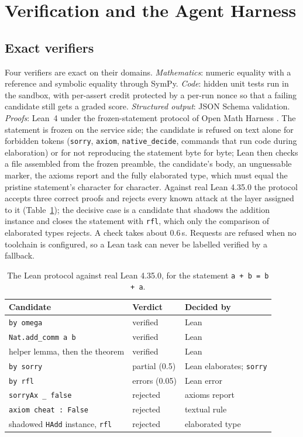 \section{Verification and the Agent Harness}
\label{sec:harness}

\subsection{Exact verifiers}
\label{sec:verifiers}
Four verifiers are exact on their domains. \emph{Mathematics}: numeric
equality with a reference and symbolic equality through SymPy. \emph{Code}:
hidden unit tests run in the sandbox, with per-assert credit protected by a
per-run nonce so that a failing candidate still gets a graded score.
\emph{Structured output}: JSON Schema validation. \emph{Proofs}: Lean~4
\cite{moura2021lean4} under the frozen-statement protocol of Open Math Harness
\cite{openmathharness2026}. The statement is frozen on the service side; the
candidate is refused on text alone for forbidden tokens (\texttt{sorry},
\texttt{axiom}, \texttt{native\_decide}, commands that run code during
elaboration) or for not reproducing the statement byte for byte; Lean then
checks a file assembled from the frozen preamble, the candidate's body, an
unguessable marker, the axioms report and the fully elaborated type, which must
equal the pristine statement's character for character. Against real Lean
4.35.0 the protocol accepts three correct proofs and rejects every known
attack at the layer assigned to it (Table~\ref{tab:reallean}); the decisive
case is a candidate that shadows the addition instance and closes the
statement with \texttt{rfl}, which only the comparison of elaborated types
rejects. A check takes about 0.6\,s. Requests are refused when no toolchain is
configured, so a Lean task can never be labelled verified by a fallback.

\begin{table}[t]
\centering
\caption{The Lean protocol against real Lean 4.35.0, for the statement \texttt{a + b = b + a}.}
\label{tab:reallean}
\scriptsize
\begin{tabular}{@{}lll@{}}
\toprule
Candidate & Verdict & Decided by \\
\midrule
\texttt{by omega} & verified & Lean \\
\texttt{Nat.add\_comm a b} & verified & Lean \\
helper lemma, then the theorem & verified & Lean \\
\texttt{by sorry} & partial (0.5) & Lean elaborates; \texttt{sorry} \\
\texttt{by rfl} & errors (0.05) & Lean error \\
\texttt{sorryAx \_ false} & rejected & axioms report \\
\texttt{axiom cheat : False} & rejected & textual rule \\
shadowed \texttt{HAdd} instance, \texttt{rfl} & rejected & elaborated type \\
\bottomrule
\end{tabular}
\end{table}

